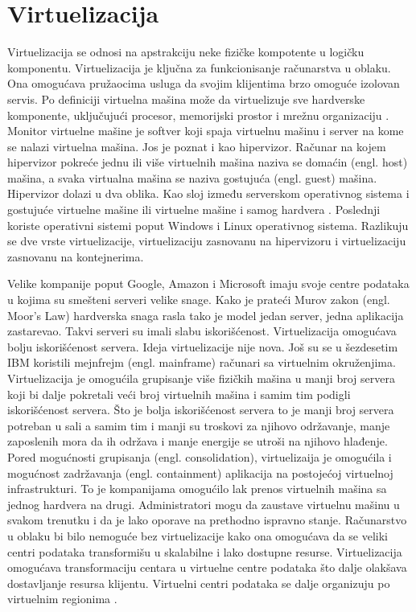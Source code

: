 \documentclass[12pt,oneside]{memoir}
\begin{document}


\section{Virtuelizacija}
Virtuelizacija se odnosi na apstrakciju neke fizičke kompotente u logičku komponentu. Virtuelizacija je ključna za funkcionisanje računarstva u oblaku. Ona omogućava pružaocima usluga da svojim klijentima brzo omoguće izolovan servis. Po definiciji virtuelna mašina može da virtuelizuje sve hardverske komponente, uključujući procesor, memorijski prostor i mrežnu organizaciju \cite{ve}. Monitor virtuelne mašine je softver koji spaja virtuelnu mašinu i server na kome se nalazi virtuelna mašina. Jos je poznat i kao hipervizor. Računar na kojem hipervizor pokreće jednu ili više virtuelnih mašina naziva se domaćin (engl. host) mašina, a svaka virtualna mašina se naziva gostujuća (engl. guest) mašina. Hipervizor dolazi u dva oblika. Kao sloj između serverskom operativnog sistema i gostujuće virtuelne mašine ili virtuelne mašine i samog hardvera \cite{ve}. Poslednji koriste operativni sistemi poput Windows i Linux operativnog sistema. Razlikuju se dve vrste virtuelizacije, virtuelizaciju zasnovanu na hipervizoru i virtuelizaciju zasnovanu na kontejnerima.
 
Velike kompanije poput Google, Amazon i Microsoft imaju svoje centre podataka u kojima su smešteni serveri velike snage. Kako je prateći Murov zakon (engl. Moor's Law) hardverska snaga rasla tako je model jedan server, jedna aplikacija zastarevao. Takvi serveri su imali slabu iskorišćenost. Virtuelizacija omogućava bolju iskorišćenost servera. Ideja virtuelizacije nije nova. Još su se u šezdesetim IBM koristili mejnfrejm (engl. mainframe) računari sa virtuelnim okruženjima. Virtuelizacija je omogućila grupisanje više fizičkih mašina u manji broj servera koji bi dalje pokretali veći broj virtuelnih mašina i samim tim podigli iskorišćenost servera. Što je bolja iskorišćenost servera to je manji broj servera potreban u sali a samim tim i manji su troskovi za njihovo održavanje, manje zaposlenih mora da ih održava i manje energije se utroši na njihovo hlađenje. Pored mogućnosti grupisanja (engl. consolidation), virtuelizaija je omogućila i mogućnost zadržavanja (engl. containment) aplikacija na postojećoj virtuelnoj infrastrukturi. To je kompanijama omogućilo lak prenos virtuelnih mašina sa jednog hardvera na drugi. Administratori mogu da zaustave virtuelnu mašinu u svakom trenutku i da je lako oporave na prethodno ispravno stanje. Računarstvo u oblaku bi bilo nemoguće bez virtuelizacije kako ona omogućava da se veliki centri podataka transformišu u skalabilne i lako dostupne resurse. Virtuelizacija omogućava transformaciju centara u virtuelne centre podataka što dalje olakšava dostavljanje resursa klijentu. Virtuelni centri podataka se dalje organizuju po virtuelnim regionima \cite{ve}.
\end{document}
